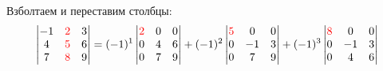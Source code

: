 \begin{frame}
\[\]
Взболтаем и переставим столбцы:
\[
    \begin{vmatrix}
        -1 & \textcolor{red}{2} & 3 \\
        4 & \textcolor{red}{5} & 6 \\
        7 & \textcolor{red}{8} & 9 \\
    \end{vmatrix}  =       
    (-1)^1 \begin{vmatrix}
        \textcolor{red}{2} & 0   & 0 \\
        0 & 4  & 6 \\
        0 & 7  & 9 \\
    \end{vmatrix} +
    (-1)^2 \begin{vmatrix}
        \textcolor{red}{5} & 0 & 0 \\
       0 & -1 & 3 \\
        0 & 7 & 9 \\
    \end{vmatrix} +
    (-1)^3\begin{vmatrix}
        \textcolor{red}{8} & 0 & 0 \\
        0 & -1 & 3 \\
        0 & 4 & 6 \\
    \end{vmatrix} 
\]
\end{frame}


